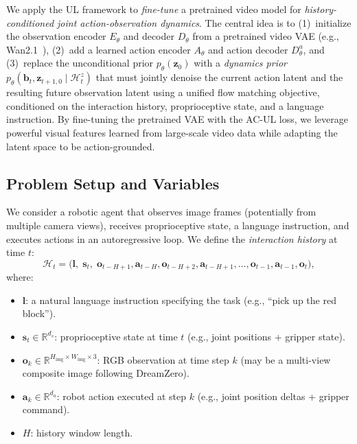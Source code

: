 \documentclass{article}
\newcommand{\vo}{\bm{o}}
\newcommand{\vz}{\bm{z}}
\newcommand{\va}{\bm{a}}
\newcommand{\vb}{\bm{b}}
\newcommand{\R}{\mathbb{R}}
\begin{document}
We apply the UL framework to \emph{fine-tune} a pretrained video model for \emph{history-conditioned joint action-observation dynamics}.
The central idea is to (1)~initialize the observation encoder $E_\theta$ and decoder $D_\theta$ from a pretrained video VAE (e.g., Wan2.1~\citep{wan2025}), (2)~add a learned action encoder $A_\theta$ and action decoder $D_\theta^a$, and (3)~replace the unconditional prior $p_\theta(\vz_0)$ with a \emph{dynamics prior} $p_\theta(\vb_t, \vz_{t+1,0} \mid \mathcal{H}_t^z)$ that must jointly denoise the current action latent and the resulting future observation latent using a unified flow matching objective, conditioned on the interaction history, proprioceptive state, and a language instruction.
By fine-tuning the pretrained VAE with the AC-UL loss, we leverage powerful visual features learned from large-scale video data while adapting the latent space to be action-grounded.

\subsection{Problem Setup and Variables}
\label{sec:variables}

We consider a robotic agent that observes image frames (potentially from multiple camera views), receives proprioceptive state, a language instruction, and executes actions in an autoregressive loop. We define the \emph{interaction history} at time $t$:
\begin{equation}
  \mathcal{H}_t = \big(\bm{l},\; \bm{s}_t,\; \vo_{t-H+1}, \va_{t-H}, \vo_{t-H+2}, \va_{t-H+1}, \ldots, \vo_{t-1}, \va_{t-1}, \vo_t\big),
  \label{eq:history}
\end{equation}
where:
\begin{itemize}[leftmargin=*,itemsep=2pt]
  \item $\bm{l}$: a natural language instruction specifying the task (e.g., ``pick up the red block'').
  \item $\bm{s}_t \in \R^{d_s}$: proprioceptive state at time $t$ (e.g., joint positions + gripper state).
  \item $\vo_k \in \R^{H_{\text{img}} \times W_{\text{img}} \times 3}$: RGB observation at time step $k$ (may be a multi-view composite image following DreamZero).
  \item $\va_k \in \R^{d_a}$: robot action executed at step $k$ (e.g., joint position deltas + gripper command).
  \item $H$: history window length.
\end{itemize}
\end{document}
